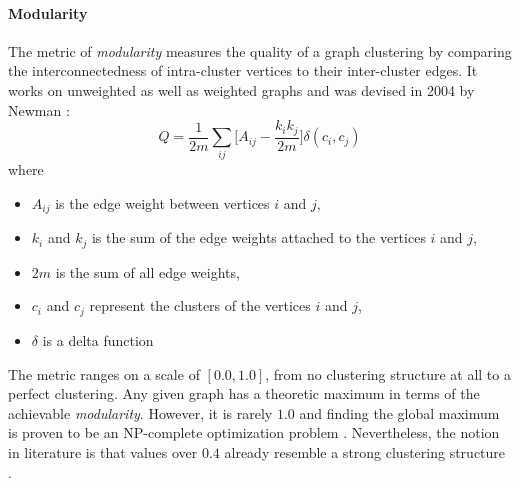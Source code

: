 \documentclass[12pt,a4paper]{report}
\begin{document}
\paragraph{Modularity}
The metric of \textit{modularity} measures the quality of a graph clustering
by comparing the interconnectedness of intra-cluster vertices to their
inter-cluster edges. It works on unweighted as well as weighted graphs
\cite{clauset2004modularity, blondel2008modularity}
and was devised in 2004 by Newman \cite{newman2004fast}:
\[
  Q =
  \frac{1}{2m}
  \sum \limits _{ij}{\bigg[ A_{ij} - \frac{k_i k_j}{2m} \bigg]}
  \delta (c_i, c_j)
\]
where
\begin{itemize}[noitemsep]
  \item \(A_{ij}\) is the edge weight between vertices \(i\) and \(j\),
  \item \(k_i\) and \(k_j\) is the sum of the edge weights attached to
        the vertices \(i\) and \(j\),
  \item \(2m\) is the sum of all edge weights,
  \item \(c_i\) and \(c_j\) represent the clusters of the vertices \(i\) and \(j\),
  \item \(\delta\) is a delta function
\end{itemize}
The metric ranges on a scale of \([0.0, 1.0]\), from no clustering structure
at all to a perfect clustering. Any given graph has a theoretic maximum in terms
of the achievable \textit{modularity}. However, it is rarely \(1.0\) and finding
the global maximum is proven to be an NP-complete optimization problem
\cite{brandes2006maximizing}. Nevertheless, the notion in literature is that
values over \(0.4\) already resemble a strong clustering structure
\cite{newman2004fast, fortunato2007resolution}.
\end{document}
